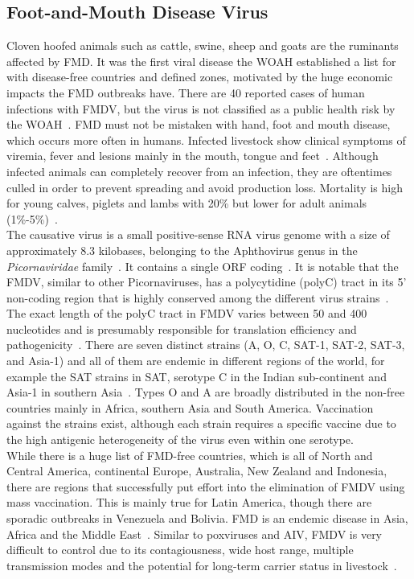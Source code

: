 \subsection{Foot-and-Mouth Disease Virus}
Cloven hoofed animals such as cattle, swine, sheep and goats are the ruminants affected by \ac{FMD}. It was the first viral disease the \ac{WOAH} established a list for with disease-free countries and defined zones, motivated by the huge economic impacts the \ac{FMD} outbreaks have. There are 40 reported cases of human infections with \ac{FMDV}, but the virus is not classified as a public health risk by the \ac{WOAH}~\cite{woah2023fmd}. \ac{FMD} must not be mistaken with hand, foot and mouth disease, which occurs more often in humans. Infected livestock show clinical symptoms of viremia, fever and lesions mainly in the mouth, tongue and feet~\cite{domingo1990genetic}. Although infected animals can completely recover from an infection, they are oftentimes culled in order to prevent spreading and avoid production loss. Mortality is high for young calves, piglets and lambs with 20\% but lower for adult animals (1\%-5\%)~\cite{woah2023fmd}. \\
The causative virus is a small positive-sense \ac{RNA} virus genome with a size of approximately 8.3 kilobases, belonging to the Aphthovirus genus in the \textit{Picornaviridae} family~\cite{tax2021virus}. It contains a single \ac{ORF} coding~\cite{ryan1989specificity}. It is notable that the \ac{FMDV}, similar to other Picornaviruses, has a polycytidine (polyC) tract in its 5' non-coding region that is highly conserved among the different virus strains~\cite{penza2021long}. The exact length of the polyC tract in \ac{FMDV} varies between 50 and 400 nucleotides and is presumably responsible for translation efficiency and pathogenicity~\cite{penza2021long}. There are seven distinct strains (A, O, C, SAT-1, SAT-2, SAT-3, and Asia-1) and all of them are endemic in different regions of the world, for example the SAT strains in \ac{SAT}, serotype C in the Indian sub-continent and Asia-1 in southern Asia~\cite{knowles2003molecular}. Types O and A are broadly distributed in the non-free countries mainly in Africa, southern Asia and South America. Vaccination against the strains exist, although each strain requires a specific vaccine due to the high antigenic heterogeneity of the virus even within one serotype. \\
While there is a huge list of \ac{FMD}-free countries, which is all of North and Central America, continental Europe, Australia, New Zealand and Indonesia, there are regions that successfully put effort into the elimination of \ac{FMDV} using mass vaccination. This is mainly true for Latin America, though there are sporadic outbreaks in Venezuela and Bolivia. \ac{FMD} is an endemic disease in Asia, Africa and the Middle East~\cite{brito2017review}. Similar to poxviruses and \ac{AIV}, \ac{FMDV} is very difficult to control due to its contagiousness, wide host range, multiple transmission modes and the potential for long-term carrier status in livestock~\cite{firestone2019reconstructing}. \\
